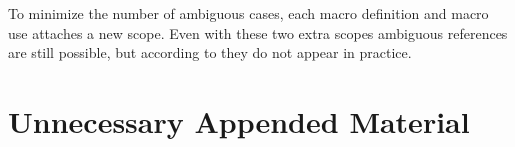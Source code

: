 \documentclass{kththesis}
\begin{document}
To minimize the number of ambiguous cases, each macro definition and macro use attaches a new scope. Even with these two extra scopes ambiguous references are still possible, but according to \textcite{Flatt:2016:BSS:2837614.2837620} they do not appear in practice.

\printbibliography[heading=bibintoc]

\appendix

\chapter{Unnecessary Appended Material}
\end{document}
